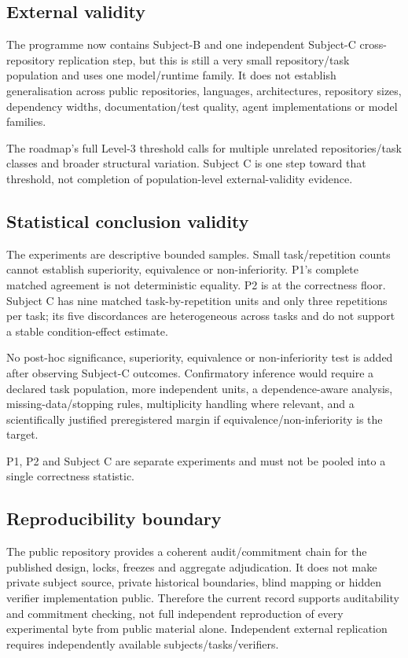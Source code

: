 \subsection{External validity}

The programme now contains Subject-B and one independent Subject-C cross-repository replication step, but this is still a very small repository/task population and uses one model/runtime family. It does not establish generalisation across public repositories, languages, architectures, repository sizes, dependency widths, documentation/test quality, agent implementations or model families.

The roadmap's full Level-3 threshold calls for multiple unrelated repositories/task classes and broader structural variation. Subject C is one step toward that threshold, not completion of population-level external-validity evidence.

\subsection{Statistical conclusion validity}

The experiments are descriptive bounded samples. Small task/repetition counts cannot establish superiority, equivalence or non-inferiority. P1's complete matched agreement is not deterministic equality. P2 is at the correctness floor. Subject C has nine matched task-by-repetition units and only three repetitions per task; its five discordances are heterogeneous across tasks and do not support a stable condition-effect estimate.

No post-hoc significance, superiority, equivalence or non-inferiority test is added after observing Subject-C outcomes. Confirmatory inference would require a declared task population, more independent units, a dependence-aware analysis, missing-data/stopping rules, multiplicity handling where relevant, and a scientifically justified preregistered margin if equivalence/non-inferiority is the target.

P1, P2 and Subject C are separate experiments and must not be pooled into a single correctness statistic.

\subsection{Reproducibility boundary}

The public repository provides a coherent audit/commitment chain for the published design, locks, freezes and aggregate adjudication. It does not make private subject source, private historical boundaries, blind mapping or hidden verifier implementation public. Therefore the current record supports auditability and commitment checking, not full independent reproduction of every experimental byte from public material alone. Independent external replication requires independently available subjects/tasks/verifiers.

